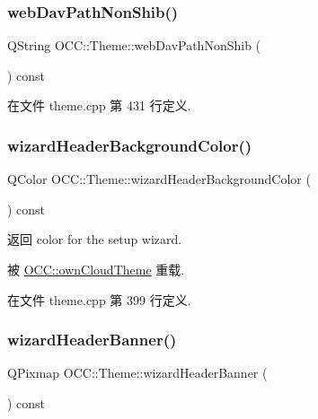\subsubsection{\texorpdfstring{web\+Dav\+Path\+Non\+Shib()}{webDavPathNonShib()}}
{\footnotesize\ttfamily Q\+String O\+C\+C\+::\+Theme\+::web\+Dav\+Path\+Non\+Shib (\begin{DoxyParamCaption}{ }\end{DoxyParamCaption}) const\hspace{0.3cm}{\ttfamily [virtual]}}



在文件 theme.\+cpp 第 431 行定义.

\mbox{\label{class_o_c_c_1_1_theme_a65e6b8932baedf7b63b61d0fd5bc5420}} 
\subsubsection{\texorpdfstring{wizard\+Header\+Background\+Color()}{wizardHeaderBackgroundColor()}}
{\footnotesize\ttfamily Q\+Color O\+C\+C\+::\+Theme\+::wizard\+Header\+Background\+Color (\begin{DoxyParamCaption}{ }\end{DoxyParamCaption}) const\hspace{0.3cm}{\ttfamily [virtual]}}

\begin{DoxyReturn}{返回}
color for the setup wizard. 
\end{DoxyReturn}


被 \hyperlink{class_o_c_c_1_1own_cloud_theme_a704928959879d3343f1d68c665bd11fb}{O\+C\+C\+::own\+Cloud\+Theme} 重载.



在文件 theme.\+cpp 第 399 行定义.

\mbox{\label{class_o_c_c_1_1_theme_a19c482f0c9757f8f16aa7f1bb17f26a7}} 
\subsubsection{\texorpdfstring{wizard\+Header\+Banner()}{wizardHeaderBanner()}}
{\footnotesize\ttfamily Q\+Pixmap O\+C\+C\+::\+Theme\+::wizard\+Header\+Banner (\begin{DoxyParamCaption}{ }\end{DoxyParamCaption}) const\hspace{0.3cm}{\ttfamily [virtual]}}


